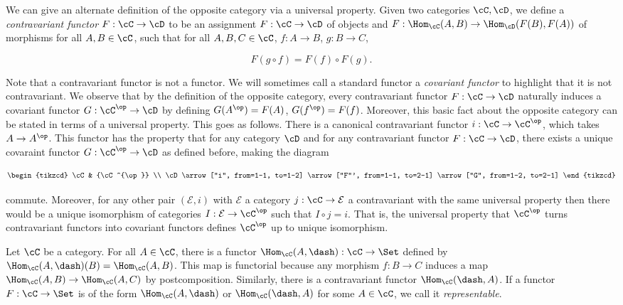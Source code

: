 \begin{rem} We can give an alternate definition of the opposite category via a universal property. Given two categories $\cC,\cD$, we define a {\em contravariant functor} $F:\cC\to \cD$ to be an assignment $F:\cC\to \cD$ of objects and $F:\Hom_{\cC}(A,B)\to \Hom_{\cD}(F(B),F(A))$ of morphisms for all $A,B\in \cC$, such that for all $A,B,C\in \cC$, $f:A\to B$, $g:B\to C$,

$$F(g\circ f)=F(f)\circ F(g).$$

Note that a contravariant functor is not a functor. We will sometimes call a standard functor a {\em covariant functor} to highlight that it is not contravariant. We observe that by the definition of the opposite category, every contravariant functor $F:\cC\to \cD$ naturally induces a covariant functor $G:\cC^{\op}\to \cD$ by defining $G(A^{\op})=F(A)$, $G(f^{\op})=F(f)$. Moreover, this basic fact about the opposite category can be stated in terms of a universal property. This goes as follows. There is a canonical contravariant functor $i:\cC\to\cC^{\op}$, which takes $A\to A^{\op}$. This functor has the property that for any category $\cD$ and for any contravariant functor $F:\cC\to \cD$, there exists a unique covaraint functor $G:\cC^{\op}\to\cD$ as defined before, making the diagram

\[\begin{tikzcd}
	\cC & {\cC^{\op}} \\
	\cD
	\arrow["i", from=1-1, to=1-2]
	\arrow["F"', from=1-1, to=2-1]
	\arrow["G", from=1-2, to=2-1]
\end{tikzcd}\]

commute. Moreover, for any other pair $(\mathcal{E},i)$ with $\mathcal{E}$ a category $j:\cC\to\mathcal{E}$ a contravariant with the same universal property then there would be a unique isomorphism of categories $I:\mathcal{E}\to \cC^{\op}$ such that $I\circ j = i$. That is, the universal property that $\cC^{\op}$ turns contravariant functors into covariant functors defines $\cC^{\op}$ up to unique isomorphism.
\end{rem}

\begin{ex} Let $\cC$ be a category. For all $A\in \cC$, there is a functor $\Hom_{\cC}(A,\dash):\cC\to\Set$ defined by $\Hom_{\cC}(A,\dash)(B)=\Hom_{\cC}(A,B)$. This map is functorial because any morphism $f:B\to C$ induces a map $\Hom_{\cC}(A,B)\to \Hom_{\cC}(A,C)$ by postcomposition. Similarly, there is a contravariant functor $\Hom_{\cC}(\dash,A)$. If a functor $F:\cC\to\Set$ is of the form $\Hom_{\cC}(A,\dash)$ or $\Hom_{\cC}(\dash,A)$ for some $A\in\cC$, we call it {\em representable}.
\end{ex}

